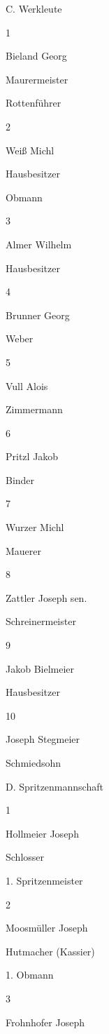 \documentclass{book}
\begin{document}
C. Werkleute

1

Bieland Georg

Maurermeister

Rottenführer

2

Weiß Michl

Hausbesitzer

Obmann

3

Almer Wilhelm

Hausbesitzer



4

Brunner Georg

Weber



5

Vull Alois

Zimmermann



6

Pritzl Jakob

Binder



7

Wurzer Michl

Mauerer



8

Zattler Joseph sen.

Schreinermeister



9

Jakob Bielmeier

Hausbesitzer



10

Joseph Stegmeier

Schmiedsohn





D. Spritzenmannschaft

1

Hollmeier Joseph

Schlosser

1. Spritzenmeister

2

Moosmüller Joseph

Hutmacher (Kassier)

1. Obmann

3

Frohnhofer Joseph
\end{document}
